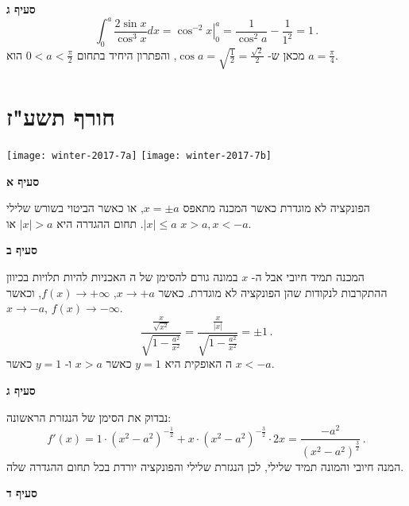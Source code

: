 \textbf{סעיף ג}
\[
\int_0^a \frac{2\sin x}{\cos^3 x}dx = \left. \cos^{-2} x \right|_0^a=\frac{1}{\cos^2 a}-\frac{1}{1^2}=1\,.
\]
מכאן ש-%
$\cos a=\sqrt{\frac{1}{2}}=\frac{\sqrt{2}}{2}$,
והפתרון היחיד בתחום
$0<a<\frac{\pi}{2}$
הוא
$a=\frac{\pi}{4}$.
\np



\section{חורף תשע"ז}

\begin{center}
\texttt{[image: winter-2017-7a]}
\texttt{[image: winter-2017-7b]}
\end{center}

\vspace{-2ex}

\textbf{סעיף א}

הפונקציה לא מוגדרת כאשר המכנה מתאפס
$x=\pm a$,
או כאשר הביטוי בשורש שלילי
$|x|\leq a$.
תחום ההגדרה היא
$|x|>a$
או
$x>a, x<-a$.

\textbf{סעיף ב}

המכנה תמיד חיובי אבל ה-%
$x$
במונה גורם להסימן של ה%
\asms{}
האכניות להיות תלויות בכיוון ההתקרבות לנקודות שהן הפונקציה לא מוגדרת. כאשר 
$x\rightarrow +a$, $f(x)\rightarrow +\infty$,
וכאשר
$x\rightarrow -a$, $f(x)\rightarrow -\infty$.
\[
\frac{\frac{x}{\sqrt{x^2}}}{\sqrt{1-\frac{a^2}{x^2}}}=\frac{\frac{x}{|x|}}{\sqrt{1-\frac{a^2}{x^2}}}=\pm 1\,.
\]
ה%
\asm{}
האופקית היא
$y=1$
כאשר 
$x>a$
ו-%
$y=1$
כאשר 
$x<-a$.

\textbf{סעיף ג}

נבדוק את הסימן של הנגזרת הראשונה:
\[
f'(x)=1\cdot(x^2-a^2)^{-\frac{1}{2}} + x\cdot (x^2-a^2)^{-\frac{3}{2}}\cdot 2x=\frac{-a^2}{(x^2-a^2)^{\frac{3}{2}}}\,.
\]
המנה חיובי והמונה תמיד שלילי, לכן הנגזרת שלילי והפונקציה יורדת בכל תחום ההגדרה שלה.

\np

\textbf{סעיף ד}

\vspace{-3ex}

\begin{center}
\end{center}

